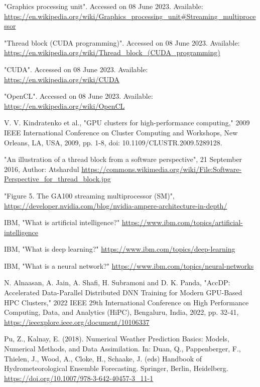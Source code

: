 \documentclass[conference]{IEEEtran}
\begin{document}
\begin{thebibliography}{00}
 "Graphics processing unit". Accessed on 08 June 2023. Available: \url{https://en.wikipedia.org/wiki/Graphics_processing_unit#Streaming_multiprocessor}

 "Thread block (CUDA programming)". Accessed on 08 June 2023. Available: \url{https://en.wikipedia.org/wiki/Thread_block_(CUDA_programming)}

 "CUDA". Accessed on 08 June 2023. Available: \url{https://en.wikipedia.org/wiki/CUDA}

 "OpenCL". Accessed on 08 June 2023. Available: \url{https://en.wikipedia.org/wiki/OpenCL}

 V. V. Kindratenko et al., "GPU clusters for high-performance computing," 2009 IEEE International Conference on Cluster Computing and Workshops, New Orleans, LA, USA, 2009, pp. 1-8, doi: 10.1109/CLUSTR.2009.5289128.



 "An illustration of a thread block from a software perspective", 21 September 2016, Author: Atshardul
\url{https://commons.wikimedia.org/wiki/File:Software-Perspective_for_thread_block.jpg}

 "Figure 5. The GA100 streaming multiprocessor (SM)",
\url{https://developer.nvidia.com/blog/nvidia-ampere-architecture-in-depth/}



 IBM, "What is artificial intelligence?" \url{https://www.ibm.com/topics/artificial-intelligence}

 IBM, "What is deep learning?" \url{https://www.ibm.com/topics/deep-learning}

 IBM, "What is a neural network?" \url{https://www.ibm.com/topics/neural-networks}

 N. Alnaasan, A. Jain, A. Shafi, H. Subramoni and D. K. Panda, "AccDP: Accelerated Data-Parallel Distributed DNN Training for Modern GPU-Based HPC Clusters," 2022 IEEE 29th International Conference on High Performance Computing, Data, and Analytics (HiPC), Bengaluru, India, 2022, pp. 32-41, \url{https://ieeexplore.ieee.org/document/10106337}

 Pu, Z., Kalnay, E. (2018). Numerical Weather Prediction Basics: Models, Numerical Methods, and Data Assimilation. In: Duan, Q., Pappenberger, F., Thielen, J., Wood, A., Cloke, H., Schaake, J. (eds) Handbook of Hydrometeorological Ensemble Forecasting. Springer, Berlin, Heidelberg. \url{https://doi.org/10.1007/978-3-642-40457-3_11-1}


\end{thebibliography}
\end{document}
